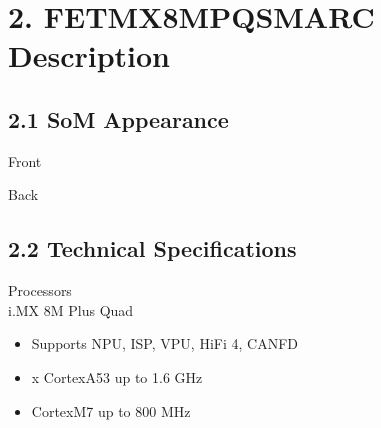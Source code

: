 \documentclass[letterpaper,10pt,openany,english]{sphinxmanual}
\begin{document}
\chapter{2. FET\sphinxhyphen{}MX8MPQ\sphinxhyphen{}SMARC Description}
\label{\detokenize{hardware:fet-mx8mpq-smarc-description}}

\section{2.1 SoM Appearance}
\label{\detokenize{hardware:som-appearance}}
\sphinxAtStartPar
{}

\sphinxAtStartPar
Front

\sphinxAtStartPar
{}

\sphinxAtStartPar
Back


\section{2.2 Technical Specifications}
\label{\detokenize{hardware:technical-specifications}}
\sphinxAtStartPar
Processors\\
i.MX 8M Plus Quad
\begin{itemize}
\item {} 
\sphinxAtStartPar
Supports NPU, ISP, VPU, HiFi 4, CAN\sphinxhyphen{}FD

\item {} 
 x Cortex\sphinxhyphen{}A53 up to 1.6 GHz

\item {} 
\sphinxAtStartPar
Cortex\sphinxhyphen{}M7 up to 800 MHz

\end{itemize}
\end{document}
